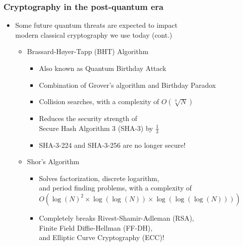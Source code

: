 \documentclass{beamer}
\begin{document}
        \begin{frame}
			\frametitle{\LARGE Cryptography in the post-quantum era}

            \vspace{2.5ex}
			\begin{itemize}
                \item Some future quantum threats are expected to impact\\ modern classical cryptography we use today (cont.)
                \begin{itemize}
                    \item Brassard-H{\o}yer-Tapp (BHT) Algorithm
                    \begin{itemize}
                        \item Also known as Quantum Birthday Attack
                        \item Combination of Grover's algorithm and Birthday Paradox
                        \item Collision searches, with a complexity of $O(\sqrt[3]{N})$
                        \item Reduces the security strength of\\ Secure Hash Algorithm 3 (SHA-3) by $\frac{1}{3}$
                        \item SHA-3-224 and SHA-3-256 are no longer secure!
                    \end{itemize}
                    \item Shor's Algorithm
                    \begin{itemize}
                        \item Solves factorization, discrete logarithm,\\ and period finding problems, with a complexity of $O( {\log(N)}^{2} \times \log(\log(N)) \times \log(\log(\log(N))) )$
                        \item Completely breaks Rivest-Shamir-Adleman (RSA),\\ Finite Field Diffie-Hellman (FF-DH),\\ and Elliptic Curve Cryptography (ECC)!
                    \end{itemize}
                \end{itemize}
            \end{itemize}
		\end{frame}
\end{document}
